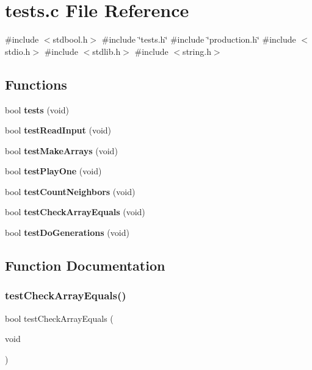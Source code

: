 \section{tests.\+c File Reference}
\label{tests_8c}
{\ttfamily \#include $<$stdbool.\+h$>$}\newline
{\ttfamily \#include \char`\"{}tests.\+h\char`\"{}}\newline
{\ttfamily \#include \char`\"{}production.\+h\char`\"{}}\newline
{\ttfamily \#include $<$stdio.\+h$>$}\newline
{\ttfamily \#include $<$stdlib.\+h$>$}\newline
{\ttfamily \#include $<$string.\+h$>$}\newline
\subsection*{Functions}
\begin{DoxyCompactItemize}
\item 
bool \textbf{ tests} (void)
\item 
bool \textbf{ test\+Read\+Input} (void)
\item 
bool \textbf{ test\+Make\+Arrays} (void)
\item 
bool \textbf{ test\+Play\+One} (void)
\item 
bool \textbf{ test\+Count\+Neighbors} (void)
\item 
bool \textbf{ test\+Check\+Array\+Equals} (void)
\item 
bool \textbf{ test\+Do\+Generations} (void)
\end{DoxyCompactItemize}


\subsection{Function Documentation}
\mbox{\label{tests_8c_adc68b5779bf3ba3a99ee3a9eb8d86935}} 
\subsubsection{test\+Check\+Array\+Equals()}
{\footnotesize\ttfamily bool test\+Check\+Array\+Equals (\begin{DoxyParamCaption}\item[{void}]{ }\end{DoxyParamCaption})}

